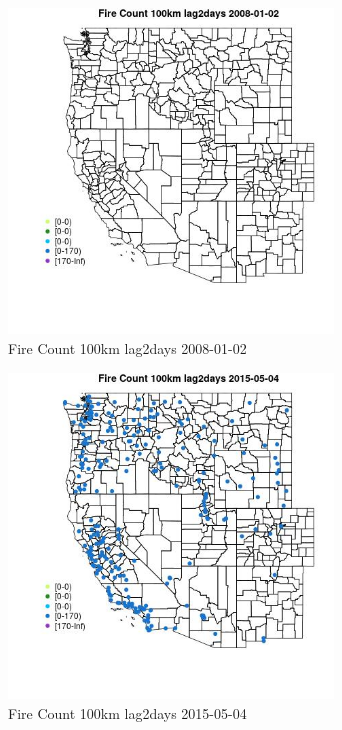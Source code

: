 \begin{figure} 
\centering  
\includegraphics[width=0.77\textwidth]{Code_Outputs/Report_ML_input_PM25_Step4_part_e_de_duplicated_aves_compiled_2019-05-18wNAs_MapObsFire_Count_100km_lag2days2008-01-02.jpg} 
\caption{\label{fig:Report_ML_input_PM25_Step4_part_e_de_duplicated_aves_compiled_2019-05-18wNAsMapObsFire_Count_100km_lag2days2008-01-02}Fire Count 100km lag2days 2008-01-02} 
\end{figure} 
 

\clearpage 

\begin{figure} 
\centering  
\includegraphics[width=0.77\textwidth]{Code_Outputs/Report_ML_input_PM25_Step4_part_e_de_duplicated_aves_compiled_2019-05-18wNAs_MapObsFire_Count_100km_lag2days2015-05-04.jpg} 
\caption{\label{fig:Report_ML_input_PM25_Step4_part_e_de_duplicated_aves_compiled_2019-05-18wNAsMapObsFire_Count_100km_lag2days2015-05-04}Fire Count 100km lag2days 2015-05-04} 
\end{figure} 
 

